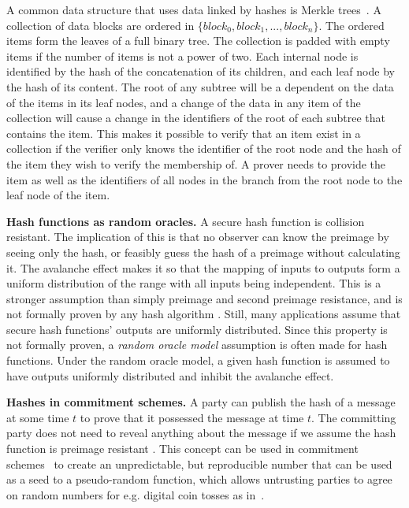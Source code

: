 A common data structure that uses data linked by hashes is Merkle trees~\cite{merkle_digital_1988}. A collection of data blocks are ordered in $\{block_0, block_1, ..., block_n\}$. The ordered items form the leaves of a full binary tree. The collection is padded with empty items if the number of items is not a power of two. Each internal node is identified by the hash of the concatenation of its children, and each leaf node by the hash of its content. The root of any subtree will be a dependent on the data of the items in its leaf nodes, and a change of the data in any item of the collection will cause a change in the identifiers of the root of each subtree that contains the item. 
This makes it possible to verify that an item exist in a collection if the verifier only knows the identifier of the root node and the hash of the item they wish to verify the membership of. A prover needs to provide the item as well as the identifiers of all nodes in the branch from the root node to the leaf node of the item. 

\noindent
{\bf Hash functions as random oracles.}
A secure hash function is collision resistant. The implication of this is that no observer can know the preimage by seeing only the hash, or feasibly guess the hash of a preimage without calculating it. The avalanche effect makes it so that the mapping of inputs to outputs form a uniform distribution of the range with all inputs being independent. This is a stronger assumption than simply preimage and second preimage resistance, and is not formally proven by any hash algorithm \cite[p.~179-181]{lindell2014introduction}. Still, many applications assume that secure hash functions' outputs are uniformly distributed. Since this property is not formally proven, a \emph{random oracle model} assumption is often made for hash functions. Under the random oracle model, a given hash function is assumed to have outputs uniformly distributed and inhibit the avalanche effect.

\noindent
{\bf Hashes in commitment schemes.}
A party can publish the hash of a message at some time $t$ to prove that it possessed the message at time $t$. The committing party does not need to reveal anything about the message if we assume the hash function is preimage resistant \cite[p.~187--189]{lindell2014introduction}. This concept can be used in commitment schemes~\cite{brassard1988minimum} to create an unpredictable, but reproducible number that can be used as a seed to a pseudo-random function, which allows untrusting parties to agree on random numbers for e.g. digital coin tosses as in~\cite{blum1983coin}.

